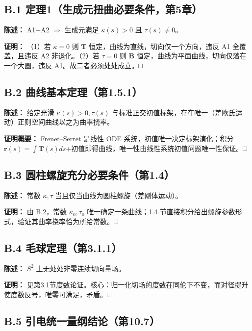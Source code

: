 \subsection{B.1
定理1（生成元扭曲必要条件，第5章）}\label{b.1-ux5b9aux74061ux751fux6210ux5143ux626dux66f2ux5fc5ux8981ux6761ux4ef6ux7b2c5ux7ae0}

\textbf{陈述：} A1+A2 \(\Rightarrow\) 生成元满足 \(\kappa(s)>0\) 且
\(\tau(s)\neq0\)。

\textbf{证明：} （1）若 \(\kappa=0\) 则 \(\mathbf{T}\)
恒定，曲线为直线，切向仅一个方向，违反 A1 全覆盖，且违反 A2
非退化。（2）若 \(\tau=0\) 则 \(\mathbf{B}\)
恒定，曲线为平面曲线，切向仅落在一个大圆，违反 A1。故二者必须处处成立。□

\subsection{B.2
曲线基本定理（第1.5.1）}\label{b.2-ux66f2ux7ebfux57faux672cux5b9aux7406ux7b2c1.5.1}

\textbf{陈述：} 给定光滑 \(\kappa(s)>0,\tau(s)\)
与标准正交初值标架，存在唯一（差欧氏运动）正则空间曲线以之为曲率挠率。

\textbf{证明概要：} Frenet--Serret 是线性 ODE
系统，初值唯一决定标架演化；积分
\(\mathbf{r}(s)=\int\mathbf{T}(s)ds\)+初值即得曲线，唯一性由线性系统初值问题唯一性保证。□

\subsection{B.3
圆柱螺旋充分必要条件（第1.4）}\label{b.3-ux5706ux67f1ux87baux65cbux5145ux5206ux5fc5ux8981ux6761ux4ef6ux7b2c1.4}

\textbf{陈述：} 常数 \(\kappa,\tau\)
当且仅当曲线为圆柱螺旋（差刚体运动）。

\textbf{证明：} 由 B.2，常数 \(\kappa_0,\tau_0\) 唯一确定一条曲线；1.4
节直接积分给出螺旋参数形式，验证其曲率挠率恰为所给常数。□

\subsection{B.4
毛球定理（第3.1.1）}\label{b.4-ux6bdbux7403ux5b9aux7406ux7b2c3.1.1}

\textbf{陈述：} \(S^2\) 上无处处非零连续切向量场。

\textbf{证明：}
见第3.1节度数论证。核心：归一化切场的度数在同伦下不变，而对径提升使度数反号，唯零可满足，矛盾。□

\subsection{B.5
引电统一量纲结论（第10.7）}\label{b.5-ux5f15ux7535ux7edfux4e00ux91cfux7eb2ux7ed3ux8bbaux7b2c10.7}

